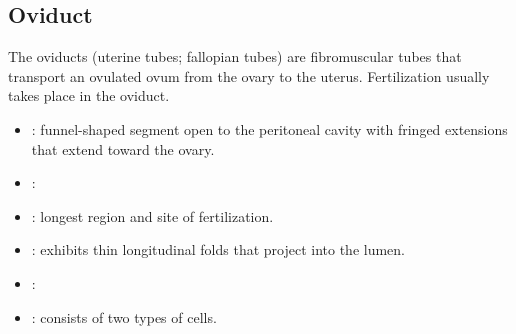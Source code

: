 \subsection{Oviduct}
The oviducts (uterine tubes; fallopian tubes) are fibromuscular tubes that transport an ovulated ovum from the ovary to the uterus. Fertilization usually takes place in the oviduct.
\begin{center}
\end{center}
\begin{multicols}{2}
\begin{itemize}
  \item {}:  funnel-shaped segment open to the peritoneal cavity with fringed extensions that extend toward the ovary.
  
  \begin{center}
  \end{center}
  
  \item {}:
  
  \begin{center}
  \end{center}
  
  \item {}: longest region and site of fertilization.
  
  \begin{center}
  \end{center}
  
  \vspace{40pt}

  \item {}: exhibits thin  longitudinal folds that project into the lumen. 
  
  \begin{center}
  \end{center}
  
  \item {}:
  
  \begin{center}
  \end{center}
  
  \item {}: consists of two types of cells.
  

\end{itemize}
\end{multicols}

